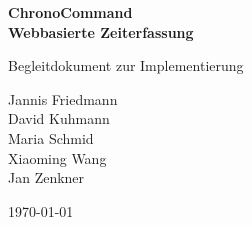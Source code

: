 \documentclass[hidelinks]{scrartcl}
\begin{document}
	\setlength{\parindent}{0pt}

	\begin{titlepage}

		\begin{center}
			\huge \bfseries ChronoCommand \\
			\large  Webbasierte Zeiterfassung
		\end{center}

		\begin{center}
				\large Begleitdokument zur Implementierung\\
		\end{center}

		\begin{center}
			Jannis Friedmann \\
			David Kuhmann \\
			Maria Schmid \\
			Xiaoming Wang \\
			Jan Zenkner \\

		\end{center}

		\begin{center}
			\large \today
		\end{center}
	
		\vfill
	\end{titlepage}
	\thispagestyle{empty}


	\clearpage
	\pagestyle{empty}
	\tableofcontents

	\clearpage
	\pagestyle{plain}
	\setcounter{page}{1}

	
	
	
	
	
	
\end{document}
